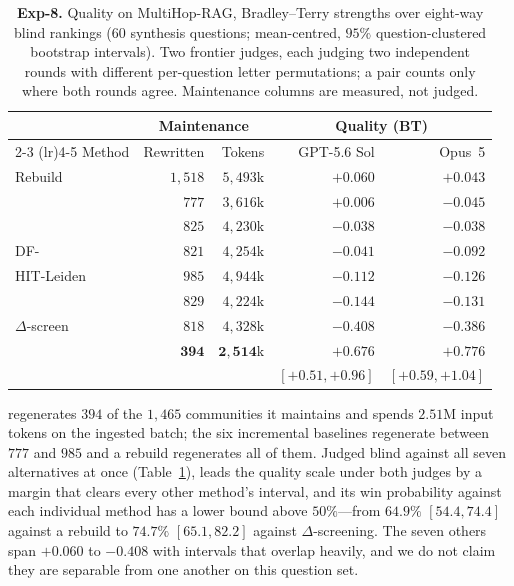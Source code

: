 \begin{table}[tb]\centering
\caption{\textbf{Exp-8.} Quality on MultiHop-RAG, Bradley--Terry strengths over
eight-way blind rankings ($60$ synthesis questions; mean-centred, $95\%$
question-clustered bootstrap intervals). Two frontier judges, each judging two
independent rounds with different per-question letter permutations; a pair counts
only where both rounds agree. Maintenance columns are measured, not judged.}
\label{tab:arena-main}
\begin{footnotesize}
\setlength{\tabcolsep}{0.38em}
\begin{tabular}{lrrrr}
\toprule
& \multicolumn{2}{c}{Maintenance} & \multicolumn{2}{c}{Quality (BT)} \\
\cmidrule(lr){2-3} \cmidrule(lr){4-5}
Method & Rewritten & Tokens & GPT-5.6 Sol & Opus~5 \\
\midrule
Rebuild         & $1{,}518$ & $5{,}493$k & $+0.060$ & $+0.043$ \\
\midrule
\Batch{}        & $777$ & $3{,}616$k & $+0.006$ & $-0.045$ \\
\DynaMo{}       & $825$ & $4{,}230$k & $-0.038$ & $-0.038$ \\
DF-\Louvain{}   & $821$ & $4{,}254$k & $-0.041$ & $-0.092$ \\
HIT-Leiden      & $985$ & $4{,}944$k & $-0.112$ & $-0.126$ \\
\QCA{}          & $829$ & $4{,}224$k & $-0.144$ & $-0.131$ \\
$\Delta$-screen & $818$ & $4{,}328$k & $-0.408$ & $-0.386$ \\
\midrule
\DyLo{} & $\mathbf{394}$ & $\mathbf{2{,}514}$k & $\mathbf{+0.676}$ & $\mathbf{+0.776}$ \\
 & & & \scriptsize$[+0.51,+0.96]$ & \scriptsize$[+0.59,+1.04]$ \\
\bottomrule
\end{tabular}
\end{footnotesize}
\end{table}

\DyLo{} regenerates $394$ of the $1{,}465$ communities it maintains and spends
$2.51$M input tokens on the ingested batch; the six incremental baselines
regenerate between $777$ and $985$ and a rebuild regenerates all of them. Judged
blind against all seven alternatives at once (Table~\ref{tab:arena-main}),
\DyLo{} leads the quality scale under both judges by a margin that clears every
other method's interval, and its win probability against each individual method
has a lower bound above $50\%$---from $64.9\%$ $[54.4,74.4]$ against a rebuild
to $74.7\%$ $[65.1,82.2]$ against $\Delta$-screening. The seven others span
$+0.060$ to $-0.408$ with intervals that overlap heavily, and we do not claim
they are separable from one another on this question set.


